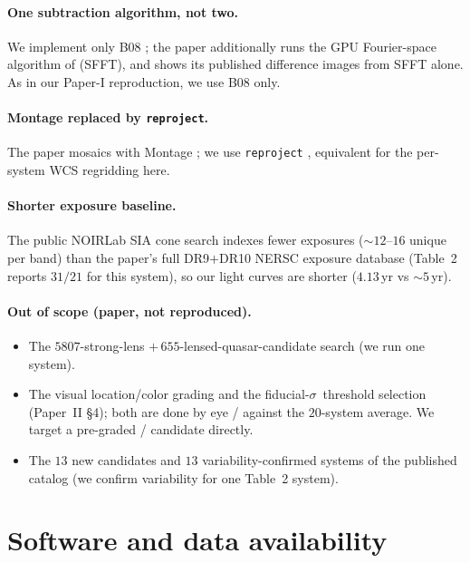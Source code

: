 \documentclass[11pt,letterpaper]{article}
\newcommand{\sig}{\ensuremath{\sigma}}
\begin{document}
\paragraph{One subtraction algorithm, not two.} We implement only B08
\autocite{bramich2008}; the paper additionally runs the GPU Fourier-space
algorithm of \citet{hu2022sfft} (SFFT), and shows its published difference
images from SFFT alone. As in our Paper-I reproduction, we use B08 only.

\paragraph{Montage replaced by \texttt{reproject}.} The paper mosaics with
Montage \autocite{jacob2010montage}; we use \texttt{reproject}
\autocite{reproject2020}, equivalent for the per-system WCS regridding here.

\paragraph{Shorter exposure baseline.} The public NOIRLab SIA cone search
indexes fewer exposures ($\sim$$12$--$16$ unique per band) than the paper's
full DR9$+$DR10 NERSC exposure database (Table~2 reports $31/21$ for this
system), so our light curves are shorter ($4.13$\,yr vs $\sim$$5$\,yr).

\paragraph{Out of scope (paper, not reproduced).}
\begin{itemize}
\item The $5807$-strong-lens $+\,655$-lensed-quasar-candidate search (we run
      one system).
\item The visual location/color grading and the fiducial-\sig\ threshold
      selection (Paper~II \S4); both are done by eye / against the
      $20$-system average. We target a pre-graded \citet{dawes2023qso} /
      \citet{he2023qso} candidate directly.
\item The $13$ new candidates and $13$ variability-confirmed systems of the
      published catalog (we confirm variability for one Table~2 system).
\end{itemize}

\section{Software and data availability}
\end{document}
